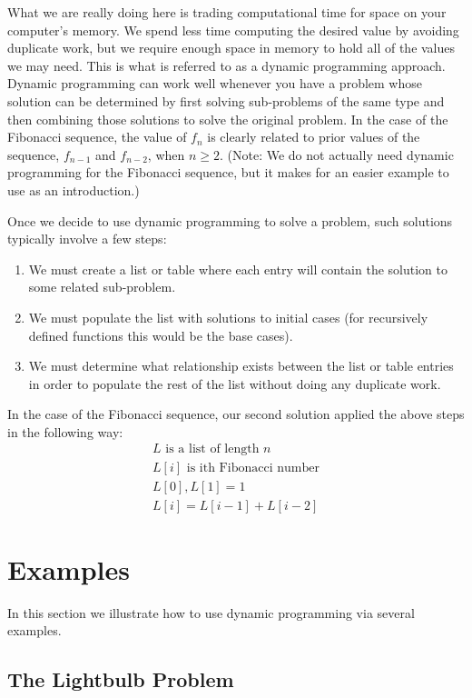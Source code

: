 \documentclass{ximera}
\begin{document}
What we are really doing here is trading computational time for space on your computer's memory. We spend less time computing the desired value by avoiding duplicate work, but we require enough space in memory to hold all of the values we may need. This is what is referred to as a dynamic programming approach. Dynamic programming can work well whenever you have a problem whose solution can be determined by first solving sub-problems of the same type and then combining those solutions to solve the original problem. In the case of the Fibonacci sequence, the value of $f_n$ is clearly related to prior values of the sequence, $f_{n-1}$ and $f_{n-2}$, when $n\geq 2$. (Note: We do not actually need dynamic programming for the Fibonacci sequence, but it makes for an easier example to use as an introduction.)

Once we decide to use dynamic programming to solve a problem, such solutions typically involve a few steps:
\begin{enumerate}
	\item We must create a list or table where each entry will contain the solution to some related sub-problem.
	\item We must populate the list with solutions to initial cases (for recursively defined functions this would be the base cases).
	\item We must determine what relationship exists between the list or table entries in order to populate the rest of the list without doing any duplicate work.
\end{enumerate}

In the case of the Fibonacci sequence, our second solution applied the above steps in the following way:
\begin{align*}
	L\text{ is a list of length $n$}\\

	L[i]\text{ is ith Fibonacci number}\\

	L[0],L[1] = 1\\

	L[i] = L[i-1] + L[i-2]
\end{align*}

\section{Examples}

In this section we illustrate how to use dynamic programming via several examples.

\subsection{The Lightbulb Problem}
\end{document}
